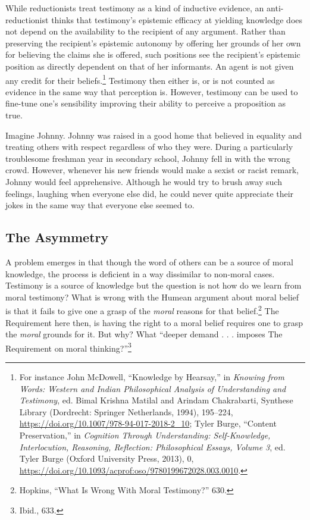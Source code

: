 \documentclass[phdthesis,12pt,final,a4paper]{wuthesis}
\theoremstyle{definition}
\theoremstyle{definition}
\theoremstyle{definition}
\theoremstyle{definition}
\theoremstyle{remark}
\begin{document}
While reductionists treat testimony as a kind of inductive evidence, an anti-reductionist thinks that testimony's epistemic efficacy at yielding knowledge does not depend on the availability to the recipient of any argument. Rather than preserving the recipient's epistemic autonomy by offering her grounds of her own for believing the claims she is offered, such positions see the recipient's epistemic position as directly dependent on that of her informants. An agent is not given any credit for their beliefs.\footnote{For instance John McDowell, {``Knowledge by {Hearsay},''} in \emph{Knowing from {Words}: {Western} and {Indian Philosophical Analysis} of {Understanding} and {Testimony}}, ed. Bimal Krishna Matilal and Arindam Chakrabarti, Synthese {Library} (Dordrecht: Springer Netherlands, 1994), 195--224, \url{https://doi.org/10.1007/978-94-017-2018-2_10}; Tyler Burge, {``Content {Preservation},''} in \emph{Cognition {Through Understanding}: {Self-Knowledge}, {Interlocution}, {Reasoning}, {Reflection}: {Philosophical Essays}, {Volume} 3}, ed. Tyler Burge (Oxford University Press, 2013), 0, \url{https://doi.org/10.1093/acprof:oso/9780199672028.003.0010}.} Testimony then either is, or is not counted as evidence in the same way that perception is. However, testimony can be used to fine-tune one's sensibility improving their ability to perceive a proposition as true.

Imagine Johnny. Johnny was raised in a good home that believed in equality and treating others with respect regardless of who they were. During a particularly troublesome freshman year in secondary school, Johnny fell in with the wrong crowd. However, whenever his new friends would make a sexist or racist remark, Johnny would feel apprehensive. Although he would try to brush away such feelings, laughing when everyone else did, he could never quite appreciate their jokes in the same way that everyone else seemed to.

\subsection*{The Asymmetry}\label{the-asymmetry}

A problem emerges in that though the word of others can be a source of moral knowledge, the process is deficient in a way dissimilar to non-moral cases. Testimony is a source of knowledge but the question is not how do we learn from moral testimony? What is wrong with the Humean argument about moral belief is that it fails to give one a grasp of the \emph{moral} reasons for that belief.\footnote{Hopkins, {``What {Is Wrong With Moral Testimony}?''} 630.} The Requirement here then, is having the right to a moral belief requires one to grasp the \emph{moral} grounds for it. But why? What ``deeper demand . . . imposes The Requirement on moral thinking?''\footnote{Ibid., 633.}
\end{document}
